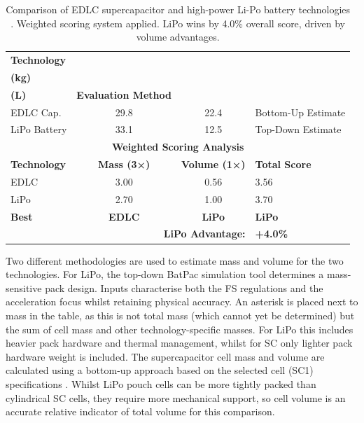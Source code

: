 \begin{table}[htbp]
    \centering
    \caption{Comparison of EDLC supercapacitor and high-power Li-Po battery technologies \cite{batpac2022manual}. Weighted scoring system applied. LiPo wins by 4.0\% overall score, driven by volume advantages.}
    \label{tab:tech_comparison}
    \footnotesize
    \begin{tabular}{|l|c|c|l|}
        \hline
        \textbf{Technology} & \makecell{\textbf{Mass*} \\ \textbf{(kg)}} & \makecell{\textbf{Cell Volume} \\ \textbf{(L)}} & \textbf{Evaluation Method} \\
        \hline
        EDLC Cap. & 29.8 & 22.4 & Bottom-Up Estimate \\
        \arrayrulecolor{gray!30}\hline\arrayrulecolor{black}
        LiPo Battery & 33.1 & 12.5 & Top-Down Estimate \\
        \hline
        \hline
        \multicolumn{4}{|c|}{\textbf{Weighted Scoring Analysis}} \\
        \hline
        \textbf{Technology} & \textbf{Mass (3×)} & \textbf{Volume (1×)} & \textbf{Total Score} \\
        \hline
        EDLC & 3.00 & 0.56 & 3.56 \\
        \arrayrulecolor{gray!30}\hline\arrayrulecolor{black}
        LiPo & 2.70 & 1.00 & 3.70 \\
        \hline
        \textbf{Best} & \textbf{EDLC} & \textbf{LiPo} & \cellcolor{green!20}\textbf{LiPo} \\
        \hline
        \multicolumn{3}{|r|}{\textbf{LiPo Advantage:}} & \textbf{+4.0\%} \\
        \hline
    \end{tabular}
\end{table}

Two different methodologies are used to estimate mass and volume for the two technologies. For LiPo, the top-down BatPac simulation tool \cite{batpac2022manual} determines a mass-sensitive pack design. Inputs characterise both the FS regulations and the acceleration focus whilst retaining physical accuracy. An asterisk is placed next to mass in the table, as this is not total mass (which cannot yet be determined) but the sum of cell mass and other technology-specific masses. For LiPo this includes heavier pack hardware and thermal management, whilst for SC only lighter pack hardware weight is included. The supercapacitor cell mass and volume are calculated using a bottom-up approach based on the selected cell (SC1) specifications \cite{sech-c46w-3r0-0600}. Whilst LiPo pouch cells can be more tightly packed than cylindrical SC cells, they require more mechanical support, so cell volume is an accurate relative indicator of total volume for this comparison.

